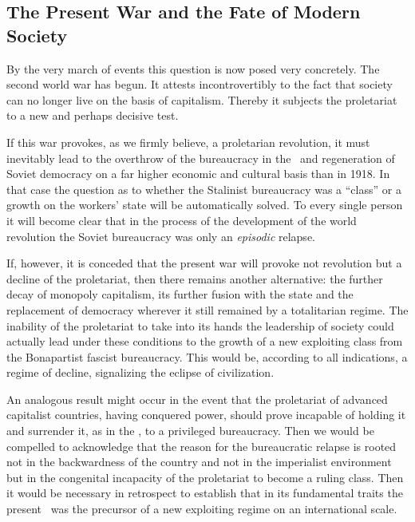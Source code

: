 \subsection*{The Present War and the Fate of Modern Society}

By the very march of events this question is now posed very concretely. The second world war has begun. It attests incontrovertibly to the fact that society can no longer live on the basis of capitalism. Thereby it subjects the proletariat to a new and perhaps decisive test.

If this war provokes, as we firmly believe, a proletarian revolution, it must inevitably lead to the overthrow of the bureaucracy in the \USSR\ and regeneration of Soviet democracy on a far higher economic and cultural basis than in 1918. In that case the question as to whether the Stalinist bureaucracy was a “class” or a growth on the workers’ state will be automatically solved. To every single person it will become clear that in the process of the development of the world revolution the Soviet bureaucracy was only an \emph{episodic} relapse.

If, however, it is conceded that the present war will provoke not revolution but a decline of the proletariat, then there remains another alternative: the further decay of monopoly capitalism, its further fusion with the state and the replacement of democracy wherever it still remained by a totalitarian regime. The inability of the proletariat to take into its hands the leadership of society could actually lead under these conditions to the growth of a new exploiting class from the Bonapartist fascist bureaucracy. This would be, according to all indications, a regime of decline, signalizing the eclipse of civilization.
\nowidow

An analogous result might occur in the event that the proletariat of advanced capitalist countries, having conquered power, should prove incapable of holding it and surrender it, as in the \USSR, to a privileged bureaucracy. Then we would be compelled to acknowledge that the reason for the bureaucratic relapse is rooted not in the backwardness of the country and not in the imperialist environment but in the congenital incapacity of the proletariat to become a ruling class. Then it would be necessary in retrospect to establish that in its fundamental traits the present \USSR\ was the precursor of a new exploiting regime on an international scale.

